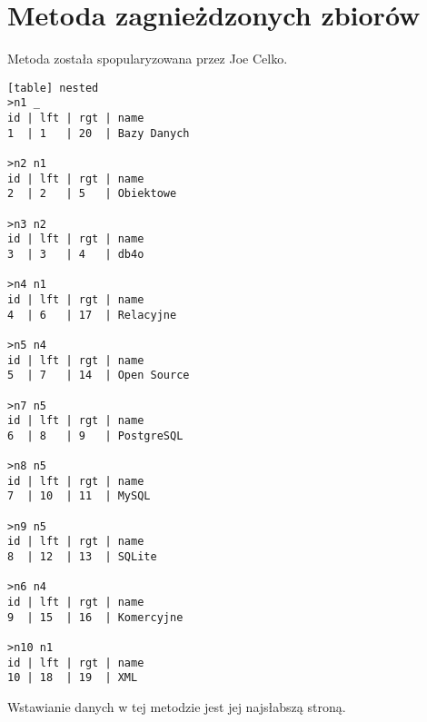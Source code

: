 \section{Metoda zagnieżdzonych zbiorów}

Metoda została spopularyzowana przez Joe Celko\cite{celko-sql}.














\begin{verbatim}[table] nested
>n1 _
id | lft | rgt | name
1  | 1   | 20  | Bazy Danych

>n2 n1
id | lft | rgt | name
2  | 2   | 5   | Obiektowe

>n3 n2
id | lft | rgt | name
3  | 3   | 4   | db4o

>n4 n1
id | lft | rgt | name
4  | 6   | 17  | Relacyjne

>n5 n4
id | lft | rgt | name
5  | 7   | 14  | Open Source

>n7 n5
id | lft | rgt | name
6  | 8   | 9   | PostgreSQL

>n8 n5
id | lft | rgt | name
7  | 10  | 11  | MySQL

>n9 n5
id | lft | rgt | name
8  | 12  | 13  | SQLite

>n6 n4
id | lft | rgt | name
9  | 15  | 16  | Komercyjne

>n10 n1
id | lft | rgt | name
10 | 18  | 19  | XML

\end{verbatim}




Wstawianie danych w tej metodzie jest jej najsłabszą stroną.





